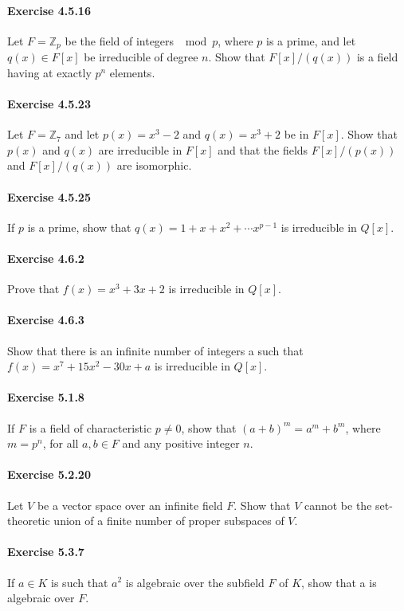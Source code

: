 \documentclass{article}
\begin{document}
\paragraph{Exercise 4.5.16} Let $F = \mathbb{Z}_p$ be the field of integers $\mod p$, where $p$ is a prime, and let $q(x) \in F[x]$ be irreducible of degree $n$. Show that $F[x]/(q(x))$ is a field having at exactly $p^n$ elements.

\paragraph{Exercise 4.5.23} Let $F = \mathbb{Z}_7$ and let $p(x) = x^3 - 2$ and $q(x) = x^3 + 2$ be in $F[x]$. Show that $p(x)$ and $q(x)$ are irreducible in $F[x]$ and that the fields $F[x]/(p(x))$ and $F[x]/(q(x))$ are isomorphic.

\paragraph{Exercise 4.5.25} If $p$ is a prime, show that $q(x) = 1 + x + x^2 + \cdots x^{p - 1}$ is irreducible in $Q[x]$.

\paragraph{Exercise 4.6.2} Prove that $f(x) = x^3 + 3x + 2$ is irreducible in $Q[x]$.

\paragraph{Exercise 4.6.3} Show that there is an infinite number of integers a such that $f(x) = x^7 + 15x^2 - 30x + a$ is irreducible in $Q[x]$.

\paragraph{Exercise 5.1.8} If $F$ is a field of characteristic $p \neq 0$, show that $(a + b)^m = a^m + b^m$, where $m = p^n$, for all $a, b \in F$ and any positive integer $n$.

\paragraph{Exercise 5.2.20} Let $V$ be a vector space over an infinite field $F$. Show that $V$ cannot be the set-theoretic union of a finite number of proper subspaces of $V$.

\paragraph{Exercise 5.3.7} If $a \in K$ is such that $a^2$ is algebraic over the subfield $F$ of $K$, show that a is algebraic over $F$.
\end{document}
